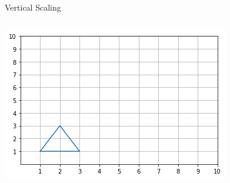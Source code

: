 \documentclass[xcolor=dvipsnames,aspectratio=169,t]{beamer}
\begin{document}
\begin{frame}{Vertical Scaling}
\begin{columns}[T]
\column{0.5\tw}

\includegraphics[width=0.95\tw]{images/fig-triangle-start.png}

\end{columns}

\end{frame}
\end{document}
